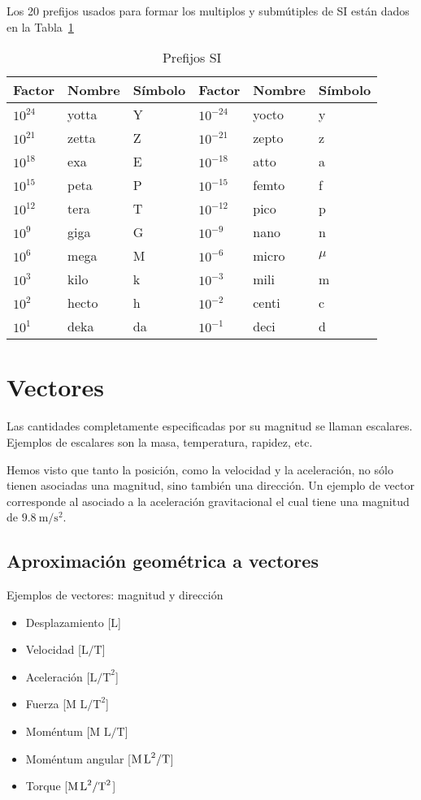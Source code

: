 Los 20 prefijos usados para formar los multiplos y submútiples de SI están dados en la Tabla~\ref{tab:sipref}
\begin{table}
  \centering
  \begin{tabular}{lll|lll}
    Factor & Nombre & Símbolo &Factor & Nombre & Símbolo \\\hline
    $10^{24}$ & yotta& Y & $10^{-24}$ & yocto & y\\
    $10^{21}$ & zetta& Z & $10^{-21}$ & zepto & z\\
    $10^{18}$ & exa  & E & $10^{-18}$ & atto  & a\\
    $10^{15}$ & peta & P & $10^{-15}$ & femto & f\\
    $10^{12}$ & tera & T & $10^{-12}$ & pico  & p\\
    $10^{9}$  & giga & G & $10^{-9}$  & nano  & n\\
    $10^{6}$  & mega & M & $10^{-6}$  & micro & $\mu$\\
    $10^{3}$  & kilo & k & $10^{-3}$  & mili  & m\\
    $10^{2}$  & hecto& h & $10^{-2}$  & centi & c\\
    $10^{1}$  & deka & da& $10^{-1}$  & deci  & d\\\hline
  \end{tabular}
  \caption{Prefijos SI}
  \label{tab:sipref}
\end{table}



\section{Vectores}
\label{sec:vectores}

Las cantidades completamente especificadas por su magnitud se llaman escalares. Ejemplos de escalares son la masa, temperatura, rapidez, etc.

Hemos visto que tanto la posición, como la velocidad y la aceleración, no sólo tienen asociadas una magnitud, sino también una dirección. Un ejemplo de vector corresponde al asociado a la aceleración gravitacional el cual tiene una magnitud de $9.8\ \text{m}/\text{s}^2$.

\subsection{Aproximación geométrica a vectores}

Ejemplos de vectores: magnitud y direcci\'on
\begin{itemize}
\item Desplazamiento [$\text{L}$]
\item Velocidad [$\text{L/T}$] 
\item Aceleración [$\text{L/T}^2$]
\item Fuerza [$\text{M L/T}^2$]
\item Moméntum [$\text{M L/T}$]
\item Moméntum angular [$\text{M\,L}^2/\text{T}$]
\item Torque [$\text{M\,L}^2/\text{T}^2$]
\end{itemize}

